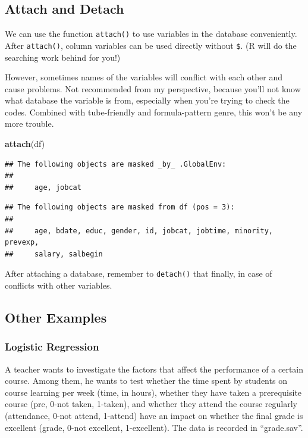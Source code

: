 \documentclass[
]{ctexart}
\newenvironment{Shaded}{\begin{snugshade}}{\end{snugshade}}
\newcommand{\FunctionTok}[1]{\textcolor[rgb]{0.13,0.29,0.53}{\textbf{#1}}}
\newcommand{\NormalTok}[1]{#1}
\begin{document}
\hypertarget{attach-and-detach}{%
\subsection{Attach and Detach}\label{attach-and-detach}}

We can use the function \texttt{attach()} to use variables in the
database conveniently. After \texttt{attach()}, column variables can be
used directly without \texttt{\$}. (R will do the searching work behind
for you!)

However, sometimes names of the variables will conflict with each other
and cause problems. Not recommended from my perspective, because you'll
not know what database the variable is from, especially when you're
trying to check the codes. Combined with tube-friendly and
formula-pattern genre, this won't be any more trouble.

\begin{Shaded}
\begin{Highlighting}[]
\FunctionTok{attach}\NormalTok{(df)}
\end{Highlighting}
\end{Shaded}

\begin{verbatim}
## The following objects are masked _by_ .GlobalEnv:
## 
##     age, jobcat
\end{verbatim}

\begin{verbatim}
## The following objects are masked from df (pos = 3):
## 
##     age, bdate, educ, gender, id, jobcat, jobtime, minority, prevexp,
##     salary, salbegin
\end{verbatim}

After attaching a database, remember to \texttt{detach()} that finally,
in case of conflicts with other variables.

\hypertarget{other-examples}{%
\subsection{Other Examples}\label{other-examples}}

\hypertarget{logistic-regression-1}{%
\subsubsection{Logistic Regression}\label{logistic-regression-1}}

A teacher wants to investigate the factors that affect the performance
of a certain course. Among them, he wants to test whether the time spent
by students on course learning per week (time, in hours), whether they
have taken a prerequisite course (pre, 0-not taken, 1-taken), and
whether they attend the course regularly (attendance, 0-not attend,
1-attend) have an impact on whether the final grade is excellent (grade,
0-not excellent, 1-excellent). The data is recorded in ``grade.sav''.
\end{document}
